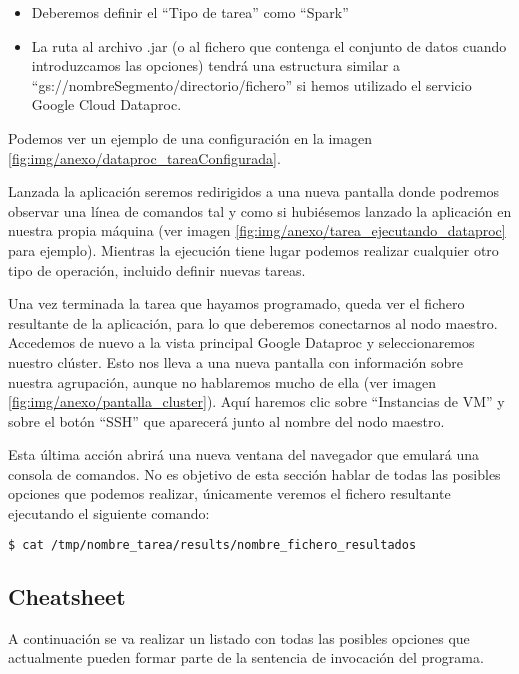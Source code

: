 \begin{itemize}
\item Deberemos definir el ``Tipo de tarea'' como ``Spark''
\item La ruta al archivo .jar (o al fichero que contenga el conjunto de datos cuando introduzcamos las opciones) tendrá una estructura similar a ``gs://nombreSegmento/directorio/fichero'' si hemos utilizado el servicio Google Cloud Dataproc.
\end{itemize}


Podemos ver un ejemplo de una configuración en la imagen \ref{fig:img/anexo/dataproc_tareaConfigurada}.


Lanzada la aplicación seremos redirigidos a una nueva pantalla donde podremos observar una línea de comandos tal y como si hubiésemos  lanzado la aplicación en nuestra propia máquina (ver imagen \ref{fig:img/anexo/tarea_ejecutando_dataproc} para ejemplo). Mientras la ejecución tiene lugar podemos realizar cualquier otro tipo de operación, incluido definir nuevas tareas.


Una vez terminada la tarea que hayamos programado, queda ver el fichero resultante de la aplicación, para lo que deberemos conectarnos al nodo maestro. Accedemos de nuevo a la vista principal Google Dataproc y seleccionaremos nuestro clúster. Esto nos lleva a una nueva pantalla con información sobre nuestra agrupación, aunque no hablaremos mucho de ella (ver imagen \ref{fig:img/anexo/pantalla_cluster}). Aquí haremos clic sobre ``Instancias de VM'' y sobre el botón ``SSH'' que aparecerá junto al nombre del nodo maestro.


Esta última acción abrirá una nueva ventana del navegador que emulará una consola de comandos. No es objetivo de esta sección hablar de todas las posibles opciones que podemos realizar, únicamente veremos el fichero resultante ejecutando el siguiente comando:


\begin{lstlisting}[language=bash]
$ cat /tmp/nombre_tarea/results/nombre_fichero_resultados
\end{lstlisting}

\subsection{Cheatsheet}\label{subsec:cheatsheet}
A continuación se va realizar un listado con todas las posibles opciones que actualmente pueden formar parte de la sentencia de invocación del programa.


